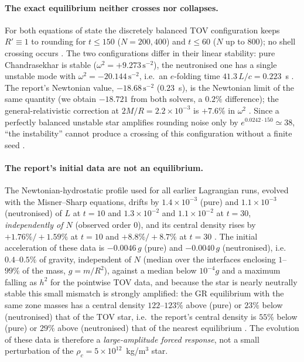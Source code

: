 \documentclass[11pt]{article}
\begin{document}
\paragraph{The exact equilibrium neither crosses nor collapses.}  For both equations of state the discretely balanced TOV configuration keeps $R'\equiv1$ to rounding for $t\le150$ ($N=200,400$) and $t\le60$ ($N$ up to $800$); no shell crossing occurs \LP.  The two configurations differ in their linear stability: pure Chandrasekhar is stable ($\omega^2=+9.273\,\mathrm{s^{-2}}$), the neutronised one has a single unstable mode with $\omega^2=-20.144\,\mathrm{s^{-2}}$, i.e.\ an $e$-folding time $41.3\,L/c=0.223$~s \LP.  The report's Newtonian value, $-18.68\,\mathrm{s^{-2}}$ ($0.23$~s), is the Newtonian limit of the same quantity (we obtain $-18.721$ from both solvers, a $0.2\%$ difference); the general-relativistic correction at $2M/R=2.2\times10^{-3}$ is $+7.6\%$ in $\omega^2$ \LP.  Since a perfectly balanced unstable star amplifies rounding noise only by $e^{0.0242\cdot150}\simeq38$, ``the instability'' cannot produce a crossing of this configuration without a finite seed \LP.

\paragraph{The report's initial data are not an equilibrium.}  The Newtonian-hydrostatic profile used for all earlier Lagrangian runs, evolved with the Misner--Sharp equations, drifts by $1.4\times10^{-3}$ (pure) and $1.1\times10^{-3}$ (neutronised) of $L$ at $t=10$ and $1.3\times10^{-2}$ and $1.1\times10^{-2}$ at $t=30$, \emph{independently of $N$} (observed order $0$), and its central density rises by $+1.76\%/+1.59\%$ at $t=10$ and $+8.8\%/+8.7\%$ at $t=30$ \LP.  The initial acceleration of these data is $-0.0046\,g$ (pure) and $-0.0040\,g$ (neutronised), i.e.\ $0.4$--$0.5\%$ of gravity, independent of $N$ (median over the interfaces enclosing $1$--$99\%$ of the mass, $g=m/R^2$), against a median below $10^{-4}g$ and a maximum falling as $h^2$ for the pointwise TOV data, and because the star is nearly neutrally stable this small mismatch is strongly amplified: the GR equilibrium with the same zone masses has a central density $122$--$123\%$ above (pure) or $23\%$ below (neutronised) that of the TOV star, i.e.\ the report's central density is $55\%$ below (pure) or $29\%$ above (neutronised) that of the nearest equilibrium \LP.  The evolution of these data is therefore a \emph{large-amplitude forced response}, not a small perturbation of the $\rho_c=5\times10^{12}$~kg/m$^3$ star.
\end{document}
